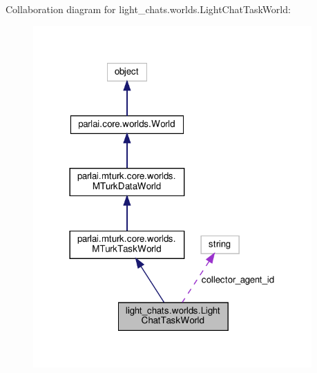 Collaboration diagram for light\+\_\+chats.\+worlds.\+Light\+Chat\+Task\+World\+:
\nopagebreak
\begin{figure}[H]
\begin{center}
\leavevmode
\includegraphics[width=302pt]{classlight__chats_1_1worlds_1_1LightChatTaskWorld__coll__graph}
\end{center}
\end{figure}
